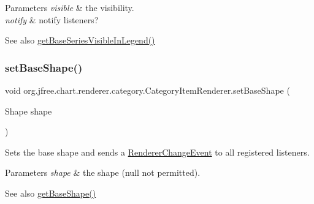\begin{DoxyParams}{Parameters}
{\em visible} & the visibility. \\
\hline
{\em notify} & notify listeners?\\
\hline
\end{DoxyParams}
\begin{DoxySeeAlso}{See also}
\mbox{\hyperlink{interfaceorg_1_1jfree_1_1chart_1_1renderer_1_1category_1_1_category_item_renderer_a5dbb34f875d6bbd46e99e3ec0d06f27c}{get\+Base\+Series\+Visible\+In\+Legend()}} 
\end{DoxySeeAlso}
\mbox{\label{interfaceorg_1_1jfree_1_1chart_1_1renderer_1_1category_1_1_category_item_renderer_a239cddb1eab54345044f1a4eb430eb03}} 
\subsubsection{\texorpdfstring{set\+Base\+Shape()}{setBaseShape()}}
{\footnotesize\ttfamily void org.\+jfree.\+chart.\+renderer.\+category.\+Category\+Item\+Renderer.\+set\+Base\+Shape (\begin{DoxyParamCaption}\item[{Shape}]{shape }\end{DoxyParamCaption})}

Sets the base shape and sends a \mbox{\hyperlink{}{Renderer\+Change\+Event}} to all registered listeners.


\begin{DoxyParams}{Parameters}
{\em shape} & the shape ({\ttfamily null} not permitted).\\
\hline
\end{DoxyParams}
\begin{DoxySeeAlso}{See also}
\mbox{\hyperlink{interfaceorg_1_1jfree_1_1chart_1_1renderer_1_1category_1_1_category_item_renderer_aa2f1c91f2cc80bc26e5e4e2506aa6f69}{get\+Base\+Shape()}} 
\end{DoxySeeAlso}
\mbox{\label{interfaceorg_1_1jfree_1_1chart_1_1renderer_1_1category_1_1_category_item_renderer_a4257e7b0cbcca4dcb130a2f0e239c0cd}} 
